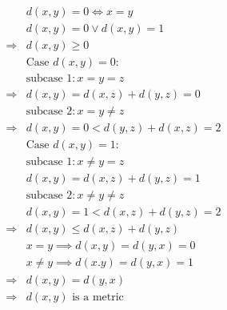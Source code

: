 \documentclass{article}
\begin{document}
\begin{equation*}
    \begin{split}
        &d(x,y)=0\Leftrightarrow x=y\\
        &d(x,y)=0\lor d(x,y)=1\\
        \Rightarrow&d(x,y)\geqslant0\\
        &\text{Case }d(x,y)=0:\\
        &\text{subcase 1}:x=y=z\\
        \Rightarrow&d(x,y)=d(x,z)+d(y,z)=0\\
        &\text{subcase 2}:x=y\ne z\\
        \Rightarrow&d(x,y)=0<d(y,z)+d(x,z)=2\\
        &\text{Case }d(x,y)=1:\\
        &\text{subcase 1}:x\ne y=z\\
        &d(x,y)=d(x,z)+d(y,z)=1\\
        &\text{subcase 2}:x\ne y\ne z\\
        &d(x,y)=1<d(x,z)+d(y,z)=2\\
        \Rightarrow&d(x,y)\leqslant d(x,z)+d(y,z)\\
        &x=y\implies d(x,y)=d(y,x)=0\\
        &x\ne y\implies d(x.y)=d(y,x)=1\\
        \Rightarrow&d(x,y)=d(y,x)\\
        \Rightarrow&d(x,y)\text{ is a metric}\\
    \end{split}
\end{equation*}
\end{document}
